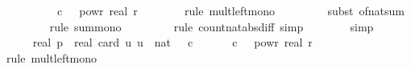 \begin{isabellebody}
\ \ \ \ \ \ {}\ {\isacharasterisk}{\kern0pt}\ {\isacharparenleft}{\kern0pt}{}\ {\isacharasterisk}{\kern0pt}\ c\ {\isacharasterisk}{\kern0pt}\ {}\ powr\ {\isacharparenleft}{\kern0pt}{\isacharminus}{\kern0pt}real\ r{\isacharparenright}{\kern0pt}{\isacharparenright}{\kern0pt}{\isacharparenright}{\kern0pt}{\isachardoublequoteclose}\isanewline
\ \ \ \ \ \ \isamarkupfalse%
\ {\isacharparenleft}{\kern0pt}rule\ mult{\isacharunderscore}{\kern0pt}left{\isacharunderscore}{\kern0pt}mono{\isacharparenright}{\kern0pt}\isanewline
\ \ \ \ \ \ \ \isamarkupfalse%
\ {\isacharparenleft}{\kern0pt}subst\ of{\isacharunderscore}{\kern0pt}nat{\isacharunderscore}{\kern0pt}sum{\isacharparenright}{\kern0pt}\isanewline
\ \ \ \ \ \ \ \isamarkupfalse%
\ {\isacharparenleft}{\kern0pt}rule\ sum{\isacharunderscore}{\kern0pt}mono{\isacharparenright}{\kern0pt}\isanewline
\ \ \ \ \ \ \ \isamarkupfalse%
\ {\isacharparenleft}{\kern0pt}rule\ count{\isacharunderscore}{\kern0pt}nat{\isacharunderscore}{\kern0pt}abs{\isacharunderscore}{\kern0pt}diff{\isacharunderscore}{\kern0pt}{}{\isacharparenleft}{\kern0pt}{}{\isacharparenright}{\kern0pt}{\isacharcomma}{\kern0pt}\ simp{\isacharparenright}{\kern0pt}\isanewline
\ \ \ \ \ \ \isamarkupfalse%
\ simp\isanewline
\ \ \ \ \isamarkupfalse%
\ \isamarkupfalse%
\ {\isachardoublequoteopen}{\isachardot}{\kern0pt}{\isachardot}{\kern0pt}{\isachardot}{\kern0pt}\ {\isasymle}\ \ {}{\isacharslash}{\kern0pt}{\isacharparenleft}{\kern0pt}real\ p{\isacharparenright}{\kern0pt}\ {\isacharasterisk}{\kern0pt}\ {\isacharparenleft}{\kern0pt}real\ {\isacharparenleft}{\kern0pt}card\ {\isacharbraceleft}{\kern0pt}u{\isachardot}{\kern0pt}\ u\ {\isasymle}\ nat\ {\isacharparenleft}{\kern0pt}{\isasymlfloor}{}\ {\isacharasterisk}{\kern0pt}\ c\ {\isasymrfloor}{\isacharparenright}{\kern0pt}{\isacharbraceright}{\kern0pt}{\isacharparenright}{\kern0pt}\ {\isacharasterisk}{\kern0pt}\ {\isacharparenleft}{\kern0pt}{}\ {\isacharasterisk}{\kern0pt}\ {\isacharparenleft}{\kern0pt}{}\ {\isacharasterisk}{\kern0pt}\ c\ {\isacharasterisk}{\kern0pt}\ {}\ powr\ {\isacharparenleft}{\kern0pt}{\isacharminus}{\kern0pt}real\ r{\isacharparenright}{\kern0pt}{\isacharparenright}{\kern0pt}{\isacharparenright}{\kern0pt}{\isacharparenright}{\kern0pt}{\isachardoublequoteclose}\isanewline
\ \ \ \ \ \ \isamarkupfalse%
\ {\isacharparenleft}{\kern0pt}rule\ mult{\isacharunderscore}{\kern0pt}left{\isacharunderscore}{\kern0pt}mono{\isacharparenright}{\kern0pt}\isanewline

\end{isabellebody}
